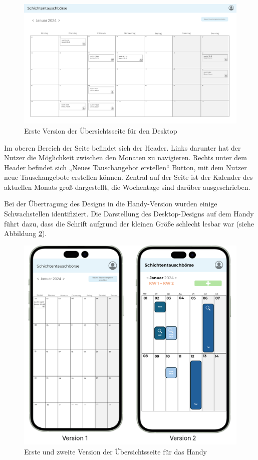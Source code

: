 \begin{figure}[h]
    \centering
    \includegraphics[clip,width=1\linewidth]{images/Version1_Desktop.png}
    \caption[Erste Version der Übersichtsseite für den Desktop]{Erste Version der Übersichtsseite für den Desktop}
    \label{Version1_Desktop}
\end{figure}

Im oberen Bereich der Seite befindet sich der Header. 
Links darunter hat der Nutzer die Möglichkeit zwischen den Monaten zu navigieren. 
Rechts unter dem Header befindet sich „Neues Tauschangebot erstellen“ Button, mit dem Nutzer neue Tauschangebote erstellen können. 
Zentral auf der Seite ist der Kalender des aktuellen Monats groß dargestellt, die Wochentage sind darüber ausgeschrieben.

Bei der Übertragung des Designs in die Handy-Version wurden einige Schwachstellen identifiziert. Die Darstellung des Desktop-Designs auf dem Handy führt dazu, dass die Schrift aufgrund der kleinen Größe schlecht lesbar war (siehe Abbildung \ref{Version12_Handy}). 

\begin{figure}[h]
    \centering
    \includegraphics[clip,width=0.75\linewidth]{images/Version12_Handy.png}
    \caption[Erste und zweite Version der Übersichtsseite für das Handy]{Erste und zweite Version der Übersichtsseite für das Handy}
    \label{Version12_Handy}
\end{figure}

